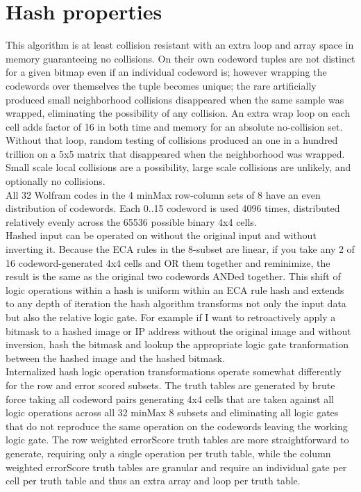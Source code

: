 \documentclass[11pt]{article}
\begin{document}
\section{Hash properties}

This algorithm is at least collision resistant with an extra loop and array space in memory guaranteeing no collisions. On their own codeword tuples are not distinct for a given bitmap even if an individual codeword is; however wrapping the codewords over themselves the tuple becomes unique; the rare artificially produced small neighborhood collisions disappeared when the same sample was wrapped, eliminating the possibility of any collision. An extra wrap loop on each cell adds factor of 16 in both time and memory for an absolute no-collision set. Without that loop, random testing of collisions produced an one in a hundred trillion on a 5x5 matrix that disappeared when the neighborhood was wrapped. Small scale local collisions are a possibility, large scale collisions are unlikely, and optionally no collisions.\\

All 32 Wolfram codes in the 4 minMax row-column sets of 8 have an even distribution of codewords. Each 0..15 codeword is used 4096 times, distributed relatively evenly across the 65536 possible binary 4x4 cells.\\

Hashed input can be operated on without the original input and without inverting it. Because the ECA rules in the 8-subset are linear, if you take any 2 of 16 codeword-generated 4x4 cells and OR them together and reminimize, the result is the same as the original two codewords ANDed together.  This shift of logic operations within a hash is uniform within an ECA rule hash and extends to any depth of iteration the hash algorithm transforms not only the input data but also the relative logic gate. For example if I want to retroactively apply a bitmask to a hashed image or IP address without the original image and without inversion, hash the bitmask and lookup the appropriate logic gate tranformation between the hashed image and the hashed bitmask.\\

Internalized hash logic operation transformations operate somewhat differently for the row and error scored subsets. The truth tables are generated by brute force taking all codeword pairs generating 4x4 cells that are taken against all logic operations across all 32 minMax 8 subsets and eliminating all logic gates that do not reproduce the same operation on the codewords leaving the working logic gate. The row weighted errorScore truth tables are more straightforward to generate, requiring only a single operation per truth table, while the column weighted errorScore truth tables are granular and require an individual gate per cell per truth table and thus an extra array and loop per truth table.\\
\end{document}
